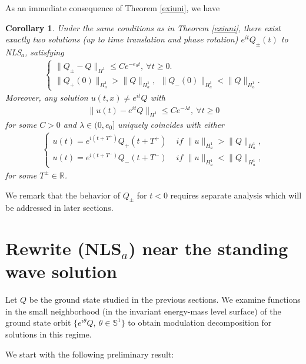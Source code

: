 \documentclass[12pt]{amsart}
\newtheorem{corollary}[theorem]{Corollary}
\begin{document}
As an immediate consequence of Theorem \ref{exiuni}, we have

\begin{corollary}\label{cor:411}
Under the same conditions as in Theorem \ref{exiuni}, there exist exactly two solutions (up to time translation and phase rotation) $e^{it}Q_{\pm} (t)$ to NLS$_a$, satisfying 
\begin{align*}
\begin{cases}
\|Q_{\pm}-Q\|_{H^1}\le C e^{-e_0t}, \ \forall t\ge 0. \\
\|Q_+(0)\|_{H_a^1}>\|Q\|_{H^1_a},\ \ \|Q_-(0)\|_{H_a^1}<\|Q\|_{H^1_a}.
\end{cases}
\end{align*}
Moreover, any solution $u(t,x) \ne e^{it}Q$ with 
\begin{align*}
\|u(t)-e^{it}Q\|_{H^1}\le C e^{-\lambda t},\ \forall t\ge 0
\end{align*}
for some $C>0$ and $\lambda\in (0, e_0]$ uniquely coincides with either
\begin{align*}
\begin{cases}
u(t)=e^{i(t+T^+)}Q_+(t+T^+) & \textit{ if } \|u\|_{H_a^1}>\|Q\|_{H_a^1},\\
u(t)=e^{i(t+T^-)}Q_-(t+T^-) & \textit{ if } \|u\|_{H_a^1}<\|Q\|_{H_a^1},
\end{cases}
\end{align*}
for some $T^{\pm}\in \mathbb R$. 
\end{corollary}

We remark that the behavior of $Q_{\pm}$ for $t<0$ requires separate analysis which will be addressed in later sections. 


\section{Rewrite (NLS$_a$) near the standing wave solution}\label{S:wave}

Let $Q$ be the ground state studied in the previous sections. We examine functions in the small neighborhood (in the invariant energy-mass level surface) of the ground state orbit $\{e^{i\theta}Q, \ \theta\in \mathbb S^1\}$ to obtain modulation decomposition for solutions in this regime. 

We start with the following preliminary result: 
\end{document}
